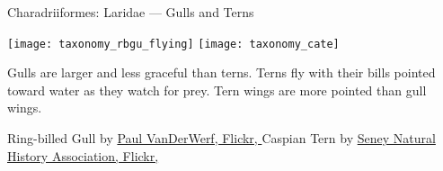 \documentclass[t]{beamer}
\begin{document}
\begin{frame}{Charadriiformes: Laridae — Gulls and Terns}

\texttt{[image: taxonomy\_rbgu\_flying]}\hfill
\texttt{[image: taxonomy\_cate]}

Gulls are larger and less graceful than terns. Terns fly with their bills pointed toward water as they watch for prey. Tern wings are more pointed than gull wings.

\vfilll

\tiny Ring-billed Gull by \href{https://flickr.com/photos/pavdw/16805907032}{Paul VanDerWerf, Flickr, } \hfill
Caspian Tern by \href{https://flickr.com/photos/seneynwr/15191931442}{Seney Natural History Association, Flickr, }


\end{frame}
\end{document}
